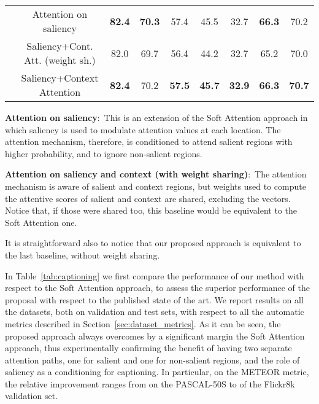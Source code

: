 \begin{table}[t]
\begin{center}
\begin{small}
\begin{tabular}{|c|c|ccccccc|}
    &  \footnotesize{Attention on saliency} & \textbf{82.4} & \textbf{70.3} & 57.4 & 45.5 & 32.7 & \textbf{66.3} &	70.2 \\ 
    &   \footnotesize{Saliency+Cont. Att. (weight sh.)} & 82.0 & 69.7 & 56.4 &	44.2 & 32.7 & 65.2 & 70.0 \\ 
    & \footnotesize{Saliency+Context Attention} & \textbf{82.4} & 70.2 & \textbf{57.5} & \textbf{45.7} & \textbf{32.9} & \textbf{66.3} & \textbf{70.7}  \\  \hline 
    \end{tabular}
    \end{small}
    \end{center}
\end{table}

\textbf{Attention on saliency}:~This is an extension of the Soft Attention approach in which saliency is used to modulate attention values at each location. The attention mechanism, therefore, is conditioned to attend salient regions with higher probability, and to ignore non-salient regions.


\textbf{Attention on saliency and context (with weight sharing)}:~The attention mechanism is aware of salient and context regions, but weights used to compute the attentive scores of salient and context are shared, excluding the  vectors. Notice that, if those were shared too, this baseline would be equivalent to the Soft Attention one.


It is straightforward also to notice that our proposed approach is equivalent to the last baseline, without weight sharing.




In Table~\ref{tab:captioning} we first compare the performance of our method with respect to the Soft Attention approach, to assess the superior performance of the proposal with respect to the published state of the art. We report results on all the datasets, both on validation and test sets, with respect to all the automatic metrics described in Section~\ref{sec:dataset_metrics}. As it can be seen, the proposed approach always overcomes by a significant margin the Soft Attention approach, thus experimentally confirming the benefit of having two separate attention paths, one for salient and one for non-salient regions, and the role of saliency as a conditioning for captioning. In particular, on the METEOR metric, the relative improvement ranges from  on the PASCAL-50S to  of the Flickr8k validation set.

